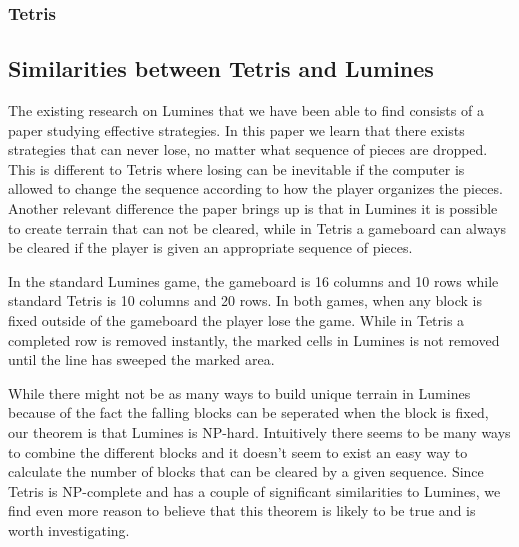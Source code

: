 \subsubsection{Tetris}

\subsection{Similarities between Tetris and Lumines}
\label{subsub:sim}

The existing research on Lumines that we have been able to find consists of a paper studying effective strategies. In this paper we learn that there exists strategies that can never lose, no matter what sequence of pieces are dropped. This is different to Tetris where losing can be inevitable if the computer is allowed to change the sequence according to how the player organizes the pieces. Another relevant difference the paper brings up is that in Lumines it is possible to create terrain that can not be cleared, while in Tetris a gameboard can always be cleared if the player is given an appropriate sequence of pieces.

In the standard Lumines game, the gameboard is 16 columns and 10 rows while standard Tetris is 10 columns and 20 rows. In both games, when any block is fixed outside of the gameboard the player lose the game. While in Tetris a completed row is removed instantly, the marked cells in Lumines is not removed until the line has sweeped the marked area.

While there might not be as many ways to build unique terrain in Lumines because of the fact the falling blocks can be seperated when the block is fixed, our theorem is that Lumines is NP-hard. Intuitively there seems to be many ways to combine the different blocks and it doesn't seem to exist an easy way to calculate the number of blocks that can be cleared by a given sequence. Since Tetris is NP-complete and has a couple of significant similarities to Lumines, we find even more reason to believe that this theorem is likely to be true and is worth investigating.
